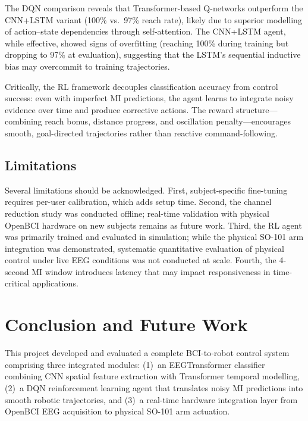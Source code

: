 \documentclass[12pt, a4paper]{article}
\begin{document}
The DQN comparison reveals that Transformer-based Q-networks outperform the CNN+LSTM variant (100\% vs.~97\% reach rate), likely due to superior modelling of action--state dependencies through self-attention. The CNN+LSTM agent, while effective, showed signs of overfitting (reaching 100\% during training but dropping to 97\% at evaluation), suggesting that the LSTM's sequential inductive bias may overcommit to training trajectories.

Critically, the RL framework decouples classification accuracy from control success: even with imperfect MI predictions, the agent learns to integrate noisy evidence over time and produce corrective actions. The reward structure---combining reach bonus, distance progress, and oscillation penalty---encourages smooth, goal-directed trajectories rather than reactive command-following.

\subsection{Limitations}

Several limitations should be acknowledged. First, subject-specific fine-tuning requires per-user calibration, which adds setup time. Second, the channel reduction study was conducted offline; real-time validation with physical OpenBCI hardware on new subjects remains as future work. Third, the RL agent was primarily trained and evaluated in simulation; while the physical SO-101 arm integration was demonstrated, systematic quantitative evaluation of physical control under live EEG conditions was not conducted at scale. Fourth, the 4-second MI window introduces latency that may impact responsiveness in time-critical applications.

\section{Conclusion and Future Work}

This project developed and evaluated a complete BCI-to-robot control system comprising three integrated modules: (1)~an EEGTransformer classifier combining CNN spatial feature extraction with Transformer temporal modelling, (2)~a DQN reinforcement learning agent that translates noisy MI predictions into smooth robotic trajectories, and (3)~a real-time hardware integration layer from OpenBCI EEG acquisition to physical SO-101 arm actuation.
\end{document}
